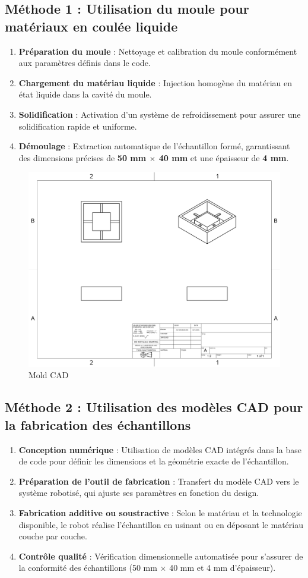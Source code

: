\documentclass[a4paper,12pt]{article}
\begin{document}
\subsection{Méthode 1 : Utilisation du moule pour matériaux en coulée liquide}
\begin{enumerate}
    \item \textbf{Préparation du moule} : Nettoyage et calibration du moule conformément aux paramètres définis dans le code.
    \item \textbf{Chargement du matériau liquide} : Injection homogène du matériau en état liquide dans la cavité du moule.
    \item \textbf{Solidification} : Activation d'un système de refroidissement pour assurer une solidification rapide et uniforme.
    \item \textbf{Démoulage} : Extraction automatique de l'échantillon formé, garantissant des dimensions précises de \textbf{50 mm $\times$ 40 mm} et une épaisseur de \textbf{4 mm}.
\end{enumerate}

\begin{figure}[h]
    \centering
    \includegraphics[width=0.5\linewidth]{Mold.png}
    \caption{Mold CAD}
    \label{fig:mold-cad}
\end{figure}

\subsection{Méthode 2 : Utilisation des modèles CAD pour la fabrication des échantillons}
\begin{enumerate}
    \item \textbf{Conception numérique} : Utilisation de modèles CAD intégrés dans la base de code pour définir les dimensions et la géométrie exacte de l'échantillon.
    \item \textbf{Préparation de l'outil de fabrication} : Transfert du modèle CAD vers le système robotisé, qui ajuste ses paramètres en fonction du design.
    \item \textbf{Fabrication additive ou soustractive} : Selon le matériau et la technologie disponible, le robot réalise l'échantillon en usinant ou en déposant le matériau couche par couche.
    \item \textbf{Contrôle qualité} : Vérification dimensionnelle automatisée pour s'assurer de la conformité des échantillons (50 mm $\times$ 40 mm et 4 mm d'épaisseur).
\end{enumerate}
\end{document}
